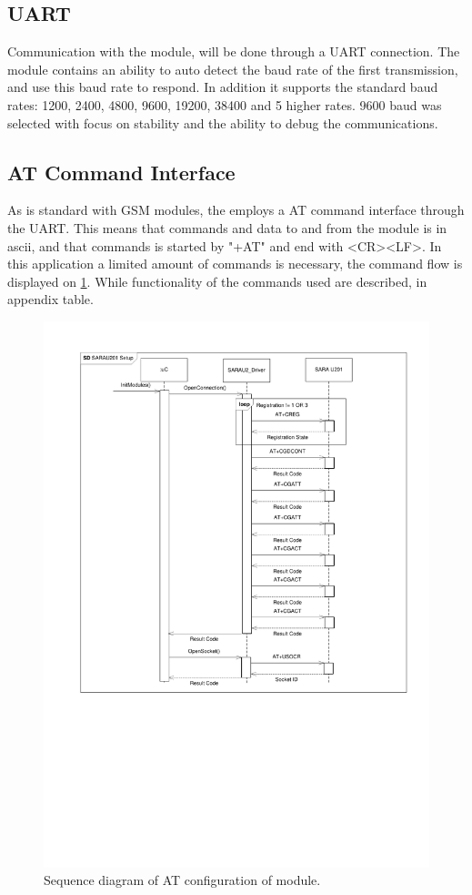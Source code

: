 \subsection{UART}
Communication with the \SARA module, will be done through a UART connection. The module contains an ability to auto detect the baud rate of the first transmission, and use this baud rate to respond. In addition it supports the standard baud rates: \num{1200}, \num{2400}, \num{4800}, \num{9600}, \num{19200}, \num{38400} and 5 higher rates. \num{9600} baud was selected with focus on stability and the ability to debug the communications.

\subsection{AT Command Interface}
As is standard with GSM modules, the \SARA employs a AT command interface through the UART. This means that commands and data to and from the module is in ascii, and that commands is started by "+AT" and end with <CR><LF>. In this application a limited amount of commands is necessary, the command flow is displayed on \cref{fig:SD:configConnection}. While functionality of the commands used are described, in appendix table. 

\begin{figure}
	\centering
	\includegraphics[width=0.9\linewidth, clip, trim={2cm 9cm 1cm 1cm}]{gfx/Design/GSMSetupConnection.pdf}
	\caption{Sequence diagram of AT configuration of \SARA module.}
	\label{fig:SD:configConnection}
\end{figure}

